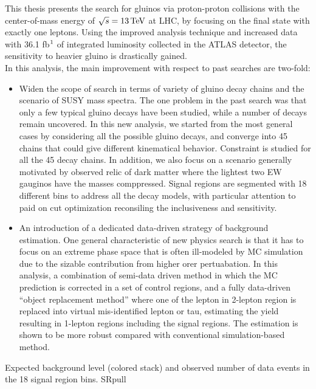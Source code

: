 This thesis presents the search for gluinos via proton-proton collisions with the center-of-mass energy of $\sqrt{s}=13\, \mathrm{TeV}$ at LHC, by focusing on the final state with exactly one leptons. 
Using the improved analysis technique and increased data with 36.1 fb$^{\-1}$ of integrated luminosity collected in the ATLAS detector, the sensitivity to heavier gluino is drastically gained.  \\

In this analysis, the main improvement with respect to past searches are two-fold: 
\begin{itemize}
\item Widen the scope of search in terms of variety of gluino decay chains and the scenario of SUSY mass spectra.
The one problem in the past search was that only a few typical gluino decays have been studied, while a number of decays remain uncovered.
In this new analysis, we started from the most general cases by considering all the possible gluino decays, and converge into 45 chains that could give different kinematical behavior.
Constraint is studied for all the 45 decay chains. In addition, we also focus on a scenario generally motivated by observed relic of dark matter where the lightest two EW gauginos have the masses comppressed.
Signal regions are segmented with 18 different bins to address all the decay models, with particular attention to paid on cut optimization reconsiling the inclusiveness and sensitivity. \\


\item An introduction of a dedicated data-driven strategy of background estimation.
One general characteristic of new physics search is that it has to focus on an extreme phase space that is often ill-modeled by MC simulation due to the sizable contribution from higher orer pertuabation.
In this analysis, a combination of semi-data driven method in which the MC prediction is corrected in a set of control regions, and a fully data-driven ``object replacement method'' 
where one of the lepton in 2-lepton region is replaced into virtual mis-identified lepton or tau, estimating the yield resulting in 1-lepton regions including the signal regions.
The estimation is shown to be more robust compared with conventional simulation-based method. \\
\end{itemize}



{Expected background level (colored stack) and observed number of data events in the 18 signal region bins.}
{SRpull}


